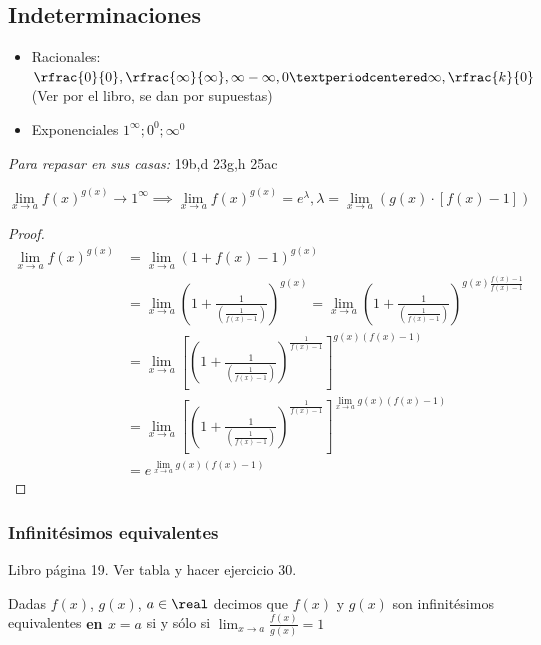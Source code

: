 \subsection{Indeterminaciones}

\begin{itemize}
	\item Racionales: $\rfrac{0}{0},\rfrac{\infty}{\infty},\infty-\infty,0·\infty, \rfrac{k}{0}$ (Ver por el libro, se dan por supuestas)
	\item Exponenciales $1^{\infty}; 0^0; \infty^0$
\end{itemize}


\begin{problem}
\textit{Para repasar en sus casas:}
\ppart 19b,d
\ppart 23g,h
\ppart 25ac
\solution
\end{problem}


\begin{prop}
\[
\lim_{x\to a}f(x)^{g(x)} \to 1^{\infty} \implies \lim_{x\to a}f(x)^{g(x)} = e^\lambda, \lambda = \lim_{x\to a} \left(g(x)·[f(x)-1]\right)
\]
\end{prop}

\begin{proof}
\begin{align*}
\lim_{x\to a}f(x)^{g(x)} &= \lim_{x\to a}(1+f(x)-1)^{g(x)}
\\
&= \lim_{x\to a}\left(1+\frac{1}{\left(\frac{1}{f(x)-1}\right)}\right)^{g(x)}
= \lim_{x\to a}\left(1+\frac{1}{\left(\frac{1}{f(x)-1}\right)}\right)^{g(x)\frac{f(x)-1}{f(x)-1}}
\\
&= \lim_{x\to a}\left[\left(1+\frac{1}{\left(\frac{1}{f(x)-1}\right)}\right)^{\frac{1}{f(x)-1}}\right]^{g(x)(f(x)-1)}
\\
&= \lim_{x\to a}\left[\left(1+\frac{1}{\left(\frac{1}{f(x)-1}\right)}\right)^{\frac{1}{f(x)-1}}\right]^{\displaystyle\lim_{x\to a}g(x)(f(x)-1)} 
\\
&= e^{\displaystyle\lim_{x\to a}g(x)(f(x)-1)}
\end{align*}
\end{proof}

\subsubsection{Infinitésimos equivalentes}

Libro página 19. Ver tabla y hacer ejercicio 30.

\begin{defn}
Dadas $f(x)$, $g(x)$, $a\in\real$ decimos que $f(x)$ y $g(x)$ son infinitésimos equivalentes \textbf{en $x=a$} si y sólo si $\displaystyle\lim_{x\to a}\frac{f(x)}{g(x)} = 1$
\end{defn}

